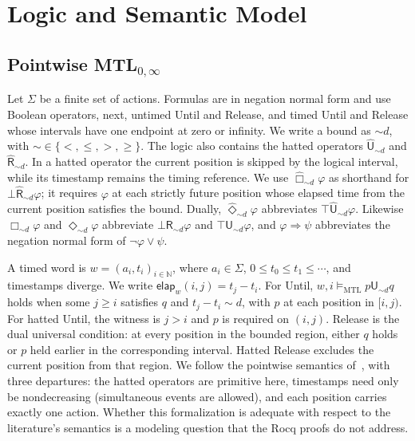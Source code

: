 \documentclass[manuscript]{acmart}
\newcommand{\Nat}{\mathbb{N}}
\newcommand{\satM}{\models_{\mathrm{MTL}}}
\newcommand{\Until}{\mathbin{\mathsf{U}}}
\newcommand{\Release}{\mathbin{\mathsf{R}}}
\newcommand{\hUntil}{\mathbin{\widehat{\mathsf{U}}}}
\newcommand{\hRelease}{\mathbin{\widehat{\mathsf{R}}}}
\newcommand{\elapsed}{\mathsf{elap}}
\begin{document}
\section{Logic and Semantic Model}
\label{sec:logic}
\subsection{Pointwise MTL$_{0,\infty}$}
\label{sec:mtl}
Let $\Sigma$ be a finite set of actions. Formulas are in negation normal
form and use Boolean operators, next, untimed Until and Release, and timed
Until and Release whose intervals have one endpoint at zero or infinity.
We write a bound as $\sim d$, with $\sim\in\{<,\le,>,\ge\}$. The logic also
contains the hatted operators $\hUntil_{\sim d}$ and
$\hRelease_{\sim d}$. In a hatted operator the current position is skipped
by the logical interval, while its timestamp remains the timing reference.
We use $\widehat{\Box}_{\sim d}\varphi$ as shorthand for
$\bot\hRelease_{\sim d}\varphi$; it requires $\varphi$ at each strictly
future position whose elapsed time from the current position satisfies the
bound. Dually, $\widehat{\Diamond}_{\sim d}\varphi$ abbreviates
$\top\hUntil_{\sim d}\varphi$. Likewise $\Box_{\sim d}\varphi$ and
$\Diamond_{\sim d}\varphi$ abbreviate $\bot\Release_{\sim d}\varphi$ and
$\top\Until_{\sim d}\varphi$, and $\varphi\Rightarrow\psi$ abbreviates the
negation normal form of $\neg\varphi\lor\psi$.

A timed word is $w=(a_i,t_i)_{i\in\Nat}$, where $a_i\in\Sigma$,
$0\le t_0\le t_1\le\cdots$, and timestamps diverge. We write
$\elapsed_w(i,j)=t_j-t_i$. For Until, $w,i\satM p\Until_{\sim d}q$
holds when some $j\ge i$ satisfies $q$ and $t_j-t_i\sim d$, with $p$ at
each position in $[i,j)$. For hatted Until, the witness is $j>i$ and $p$
is required on $(i,j)$. Release is the dual universal condition: at every
position in the bounded region, either $q$ holds or $p$ held earlier in the
corresponding interval. Hatted Release excludes the current position from
that region. We follow the pointwise semantics of~\citet{MTLsem}, with three departures:
the hatted operators are primitive here, timestamps need only be nondecreasing
(simultaneous events are allowed), and each position carries exactly one
action. Whether this formalization is adequate with respect to the literature's
semantics is a modeling question that the Rocq proofs do not address.
\end{document}
